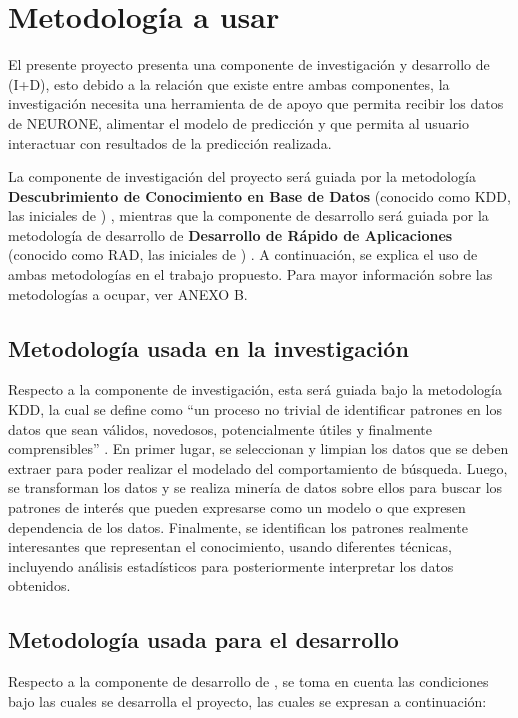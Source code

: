 \section{Metodología a usar}
\label{sec:metodologia}
El presente proyecto presenta una componente de investigación y desarrollo de  (I+D), esto debido a la relación que existe entre ambas componentes, la investigación necesita una herramienta de  de apoyo que permita recibir los datos de NEURONE, alimentar el modelo de predicción y que permita al usuario interactuar con resultados de la predicción realizada.

La componente de investigación del proyecto será guiada por la metodología \textbf{Descubrimiento de Conocimiento en Base de Datos} (conocido como KDD, las iniciales de ) \parencite{fayyad1996data}, mientras que la componente de desarrollo será guiada por la metodología de desarrollo de  \textbf{Desarrollo de Rápido de Aplicaciones} (conocido como RAD, las iniciales de ) \parencite{martin1991rapid}. A continuación, se explica el uso de ambas metodologías en el trabajo propuesto. Para mayor información sobre las metodologías a ocupar, ver ANEXO B.

\subsection{Metodología usada en la investigación}
Respecto a la componente de investigación, esta será guiada bajo la metodología KDD, la cual se define como “un proceso no trivial de identificar patrones en los datos que sean válidos, novedosos, potencialmente útiles y finalmente comprensibles” \parencite[p.~5]{fayyad1996data}. En primer lugar, se seleccionan y limpian los datos que se deben extraer para poder realizar el modelado del comportamiento de búsqueda. Luego, se transforman los datos y se realiza minería de datos sobre ellos para buscar los patrones de interés que pueden expresarse como un modelo o que expresen dependencia de los datos. Finalmente, se identifican los patrones realmente interesantes que representan el conocimiento, usando diferentes técnicas, incluyendo análisis estadísticos para posteriormente interpretar los datos obtenidos.

\subsection{Metodología usada para el desarrollo}
Respecto a la componente de desarrollo de , se toma en cuenta las condiciones bajo las cuales se desarrolla el proyecto, las cuales se expresan a continuación:

